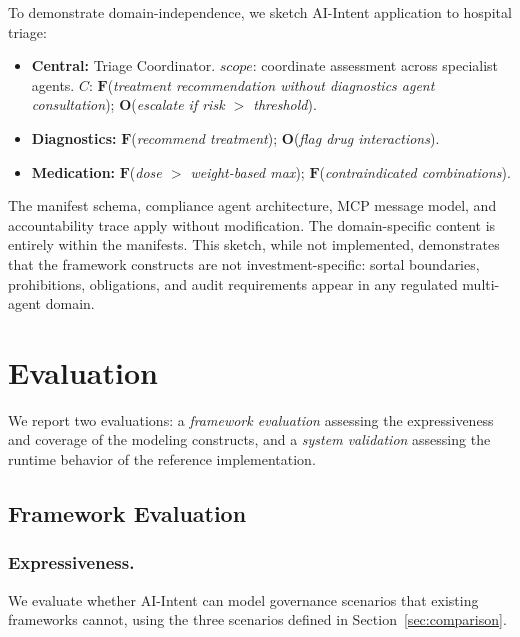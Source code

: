 \documentclass[runningheads]{llncs}
\begin{document}
To demonstrate domain-independence, we sketch AI-Intent application to
hospital triage:

\begin{itemize}
    \item \textbf{Central:} Triage Coordinator. $\mathit{scope}$:
    coordinate assessment across specialist agents.
    $C$: $\mathbf{F}$(\textit{treatment recommendation without
    diagnostics agent consultation}); $\mathbf{O}$(\textit{escalate
    if risk $>$ threshold}).
    \item \textbf{Diagnostics:} $\mathbf{F}$(\textit{recommend
    treatment}); $\mathbf{O}$(\textit{flag drug interactions}).
    \item \textbf{Medication:} $\mathbf{F}$(\textit{dose $>$ weight-based
    max}); $\mathbf{F}$(\textit{contraindicated combinations}).
\end{itemize}

The manifest schema, compliance agent architecture, MCP message model,
and accountability trace apply without modification. The domain-specific
content is entirely within the manifests. This sketch, while not
implemented, demonstrates that the framework constructs are not
investment-specific: sortal boundaries, prohibitions, obligations,
and audit requirements appear in any regulated multi-agent domain.

\section{Evaluation}
\label{sec:evaluation}

We report two evaluations: a \emph{framework evaluation} assessing the
expressiveness and coverage of the modeling constructs, and a
\emph{system validation} assessing the runtime behavior of the reference
implementation.

\subsection{Framework Evaluation}
\label{sec:framework-eval}

\subsubsection{Expressiveness.}

We evaluate whether AI-Intent can model governance scenarios that
existing frameworks cannot, using the three scenarios defined in
Section~\ref{sec:comparison}.
\end{document}

